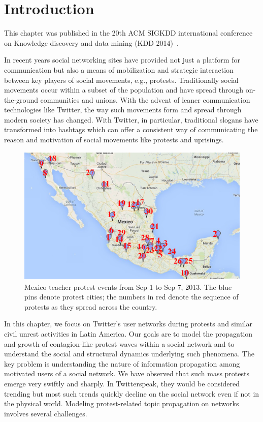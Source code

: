 \section{Introduction}
This chapter was published in the 20th ACM SIGKDD international
conference on Knowledge discovery and data mining (KDD 2014)~\cite{jin2014misinformation}.

In recent years social networking sites have provided not just a platform for communication but also a means of mobilization and strategic interaction between key players
of social movements, e.g., protests. Traditionally social movements occur
within a subset of the population and have spread through on-the-ground
communities and unions. With the advent of leaner communication
technologies like Twitter, the way such movements form and
spread through modern society has changed. With Twitter, in particular,
traditional slogans have transformed into hashtags which can
offer a consistent way of communicating the reason and
motivation of social movements like protests and uprisings.

\begin{figure}[h]
\centering
\includegraphics[scale=0.4]{figures/mexico_teacher_protest.png}
\caption{Mexico teacher protest events from Sep 1 to Sep 7, 2013. The blue pins denote protest cities; the numbers in red denote the sequence of
protests as they spread across the country.}
\label{fig:mexico_teacher}
\end{figure}


In this chapter, we focus on Twitter's
user networks during protests
and similar civil unrest activities in Latin America. Our goals
are to model the propagation and growth of contagion-like protest
waves within a social network and to understand the social and
structural dynamics underlying such phenomena. The key problem
is understanding the nature of information propagation among motivated
users of a social network. We have observed that such mass
protests emerge very swiftly and sharply. In Twitterspeak, they
would be considered trending but most such trends quickly decline
on the social network even if not in the physical world. Modeling
protest-related topic propagation on networks involves several challenges.

